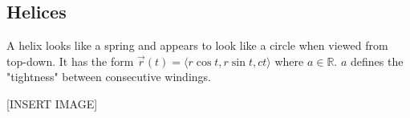 \subsection{Helices}
\noindent
A helix looks like a spring and appears to look like a circle when viewed from top-down. It has the form $\vec{r}(t)=\langle r\cos{t}, r\sin{t}, ct\rangle$ where $a\in\mathbb{R}$. $a$ defines the "tightness" between consecutive windings.

[INSERT IMAGE]